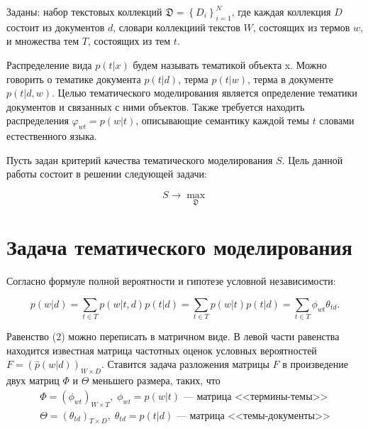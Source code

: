 \documentclass[12pt,twoside]{article}
\begin{document}
	Заданы: набор текстовых коллекций $\mathfrak{D} = \left\{D_i\right\}_{i=1}^{N}$, где каждая коллекция $D$ состоит из документов $d$, словари коллекциий текстов $W$, состоящих из термов $w$, и множества тем $T$, состоящих из тем  $t$.
	
	
	Распределение вида $p(t|x)$ будем называть тематикой объекта x. Можно говорить о тематике документа $p(t|d)$, терма $p(t|w)$, терма в документе $p(t|d, w)$.
	Целью тематического моделирования является определение тематики документов
	и связанных с ними объектов. Также требуется находить распределения $\varphi_{wt}= p(w|t)$,
	описывающие семантику каждой темы $t$ словами естественного языка.
	
	Пусть задан критерий качества тематического моделирования $S$. Цель данной работы состоит в решении следующей задачи:
	
	\begin{equation}
	S \rightarrow \max_{\mathfrak{D}}
	\end{equation}
	
	\section{Задача тематического моделирования}
	
	Согласно формуле полной вероятности и гипотезе условной независимости:
	
	\begin{equation}\label{eq_0}
	p(w|d) = \sum\limits_{t \in T} p(w|t, d) p(t|d) = \sum\limits_{t \in T} p(w|t) p(t|d) = \sum\limits_{t \in T}\phi_{wt}\theta_{td}.
	\end{equation}
	
	Равенство (2) можно переписать в матричном виде. В левой части равенства находится известная матрица частотных оценок условных вероятностей $F=(\hat{p}(w|d))_{W \times D}$. Ставится задача разложения матрицы $F$ в произведение двух матриц $\Phi$ и $\Theta$ меньшего размера, таких, что
	\begin{gather*}
	\Phi = (\phi_{wt})_{W \times T}, \; \phi_{wt} = p(w|t)      \text{ --- матрица <<термины-темы>>}\\
	\Theta = (\theta_{td})_{T \times D}, \; \theta_{td} = p(t|d)  \text{ --- матрица <<темы-документы>>}
	\end{gather*}
	
\end{document}
